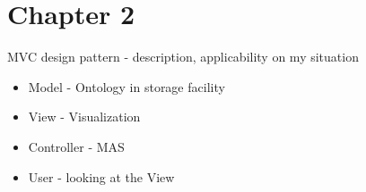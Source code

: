 \chapter{Chapter 2}
MVC design pattern - description, applicability on my situation
\begin{itemize}
\item Model - Ontology in storage facility
\item View - Visualization
\item Controller - MAS
\item User - looking at the View
\end{itemize}

    
    
    